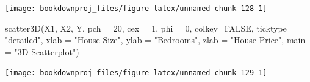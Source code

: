\documentclass[
]{book}
\newenvironment{Shaded}{\begin{snugshade}}{\end{snugshade}}
\newcommand{\AttributeTok}[1]{\textcolor[rgb]{0.77,0.63,0.00}{#1}}
\newcommand{\ConstantTok}[1]{\textcolor[rgb]{0.00,0.00,0.00}{#1}}
\newcommand{\DecValTok}[1]{\textcolor[rgb]{0.00,0.00,0.81}{#1}}
\newcommand{\FunctionTok}[1]{\textcolor[rgb]{0.00,0.00,0.00}{#1}}
\newcommand{\NormalTok}[1]{#1}
\newcommand{\OtherTok}[1]{\textcolor[rgb]{0.56,0.35,0.01}{#1}}
\newcommand{\SpecialCharTok}[1]{\textcolor[rgb]{0.00,0.00,0.00}{#1}}
\newcommand{\StringTok}[1]{\textcolor[rgb]{0.31,0.60,0.02}{#1}}
\begin{document}
\begin{Shaded}
\end{Shaded}

\begin{center}\texttt{[image: bookdownproj\_files/figure-latex/unnamed-chunk-128-1]} \end{center}

\begin{Shaded}
\begin{Highlighting}[]
\FunctionTok{scatter3D}\NormalTok{(X1, X2, Y, }\AttributeTok{pch =} \DecValTok{20}\NormalTok{, }\AttributeTok{cex =} \DecValTok{1}\NormalTok{, }\AttributeTok{phi =} \DecValTok{0}\NormalTok{,}
          \AttributeTok{colkey=}\ConstantTok{FALSE}\NormalTok{, }\AttributeTok{ticktype =} \StringTok{"detailed"}\NormalTok{,}
          \AttributeTok{xlab =} \StringTok{"House Size"}\NormalTok{, }\AttributeTok{ylab =} \StringTok{"Bedrooms"}\NormalTok{,}
          \AttributeTok{zlab =} \StringTok{"House Price"}\NormalTok{, }\AttributeTok{main =} \StringTok{"3D Scatterplot"}\NormalTok{)}
\end{Highlighting}
\end{Shaded}

\begin{center}\texttt{[image: bookdownproj\_files/figure-latex/unnamed-chunk-129-1]} \end{center}
\end{document}
